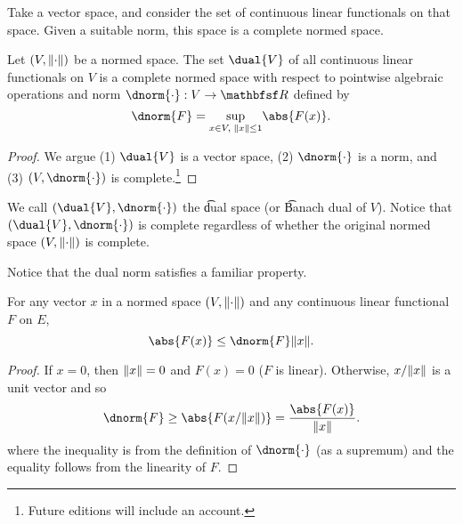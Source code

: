 

Take a vector space, and consider the set of continuous linear functionals on that space.
Given a suitable norm, this space is a complete normed space.


\begin{proposition}
	Let $(V, \lVert\cdot\rVert)$ be a normed space.
	The set $\dual{V}$ of all continuous linear functionals on $V$ is a complete normed space with respect to pointwise algebraic operations and norm $\dnorm{\cdot}: V \to \R$ defined by
	\[
		\dnorm{F} = \underset{x \in V, \;\norm{x} \leq 1}{\sup} \abs{F(x)}.
	\]
	\begin{proof}
	We argue (1) $\dual{V}$ is a vector space,  (2) $\dnorm{\cdot}$ is a norm, and (3) $(V, \dnorm{\cdot})$ is complete.\footnote{Future editions will include an account.}
	\end{proof}
\end{proposition}

We call $(\dual{V}, \dnorm{\cdot})$ the \t{dual space} (or \t{Banach dual of $V$}).
Notice that $(\dual{V}, \dnorm{\cdot})$ is complete regardless of whether the original normed space $(V,\lVert\cdot\rVert)$ is complete.


Notice that the dual norm satisfies a familiar property.

\begin{proposition}
	For any vector $x$ in a normed space $(V, \lVert\cdot\rVert)$ and any continuous linear functional $F$ on $E$,
	\[
		\abs{F(x)} \leq \dnorm{F}\norm{x}.
	\]
	\begin{proof}
		If $x = 0$, then $\lVert x\rVert = 0$ and $F(x) = 0$ ($F$ is linear). Otherwise, $x/\lVert x\rVert$ is a unit vector and so
		\[
			\dnorm{F} \geq \abs{F(x/\norm{x})} = \frac{\abs{F(x)}}{\norm{x}}.
		\]
		where the inequality is from the definition of $\dnorm{\cdot}$ (as a supremum) and the equality follows from the linearity of $F$.
	\end{proof}
\end{proposition}
